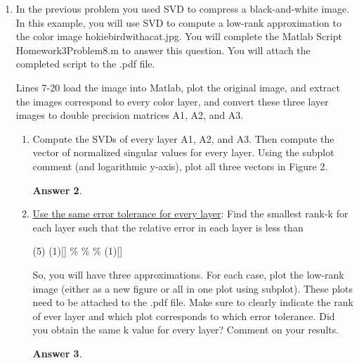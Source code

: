 \documentclass{article}
\theoremstyle{definition}
\newtheorem*{answer}{Answer}
\begin{document}
\begin{enumerate}[leftmargin=\labelsep]
\begin{enumerate}
\begin{answer}
		            \end{answer}
	      \end{enumerate}

	\item In the previous problem you used SVD to compress a black-and-white image. In this example, you will use SVD to compute a low-rank approximation to the color image hokiebirdwithacat.jpg. You will complete the Matlab Script Homework3Problem8.m to answer this question. You will attach the completed script to the .pdf file.

	      Lines 7-20 load the image into Matlab, plot the original image, and extract the images correspond to every color layer, and convert these three layer images to double precision matrices A1, A2, and A3.
	      \begin{enumerate}
		      \item Compute the SVDs of every layer A1, A2, and A3. Then compute the vector of normalized singular values for every layer. Using the subplot comment (and logarithmic y-axis), plot all three vectors in Figure 2.
		            \begin{answer}

		            \end{answer}

		      \item \underline{Use the same error tolerance for every layer}: Find the smallest rank-k for each layer such that the relative error in each layer is less than

		            \begin{tasks}[label = {(\roman*)}, label-width = 1.75em, label-offset = 0em](5)
			            \task*(1)[]
			            \%
			            \%
			            \%
			            \task*(1)[]
		            \end{tasks}

		            So, you will have three approximations. For each case, plot the low-rank image (either as a new figure or all in one plot using subplot). These plots need to be attached to the .pdf file. Make sure to clearly indicate the rank of ever layer and which plot corresponds to which error tolerance. Did you obtain the same k value for every layer? Comment on your results.
		            \begin{answer}

		            \end{answer}


\end{enumerate}
\end{enumerate}
\end{document}
